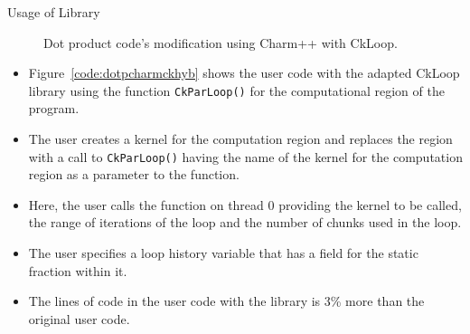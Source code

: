 \begin{frame}{Usage of Library}
\vspace*{-0.1in}
\begin{figure}[h!t]
%

    \label{code:dotpCharmckhyb}
    \hspace*{-1.9in}
    \vspace*{-0.8in}\caption{\label{code:dotPCharmckhyb}{\tiny  \label{code:dotpCharmckhyb} Dot product code's modification using Charm++ with CkLoop.}}
 
\end{figure}

\begin{itemize} 
\tiny  \item \tiny Figure~\ref{code:dotpcharmckhyb}
shows the user code with the adapted CkLoop library using the function {\tt CkParLoop()} for the computational region of the program.
\item \tiny The user creates a kernel for the computation region and replaces the region with a call to {\tt CkParLoop()} having the name of the kernel for the computation region as a parameter to the function.
\item \tiny Here, the user calls the function on thread 0 providing the kernel to be called, the range of iterations of the loop and the number of chunks used in the loop. 
\item \tiny The user specifies a loop history variable that has a field for the static fraction within it. 
\item \tiny The lines of code in the user code with the library is 3\% more than the original user code.
\end{itemize} 
\end{frame} 


